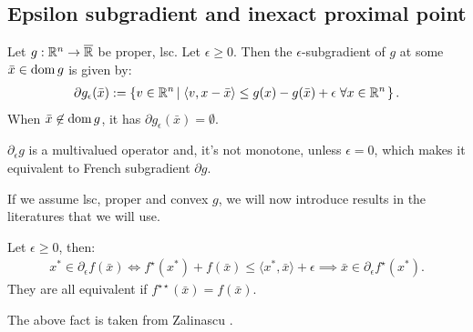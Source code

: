 \documentclass[12pt]{article}
\begin{document}
    \subsection{Epsilon subgradient and inexact proximal point}
        \begin{definition}\label{def:esp-subgrad}
            Let $g: \mathbb R^n \rightarrow \overline {\mathbb R}$ be proper, lsc. 
            Let $\epsilon \ge 0$. 
            Then the $\epsilon$-subgradient of $g$ at some $\bar x \in \operatorname{dom} g$ is given by: 
            $$
            \begin{aligned}
                \partial g_\epsilon(\bar  x) := 
                \left\lbrace
                    v \in \mathbb R^n \left| \; 
                        \langle v, x - \bar  x\rangle \le 
                        g(x) - g(\bar x) + \epsilon \;\forall x \in \mathbb R^n
                    \right. 
                \right\rbrace.
            \end{aligned}
            $$
            When $\bar x \not \in \operatorname{dom} g$, it has $\partial g_\epsilon(\bar x) = \emptyset$. 
        \end{definition}
        \begin{remark}
            $\partial_\epsilon g$ is a multivalued operator and, it's not monotone, unless $\epsilon = 0$, which makes it equivalent to French subgradient $\partial g$. 
        \end{remark}
        If we assume lsc, proper and convex $g$, we will now introduce results in the literatures that we will use. 
        \begin{fact}\label{fact:esp-fenchel-ineq}
            Let $\epsilon \ge 0$, then:
            \begin{align*}
                x^* \in \partial_\epsilon f(\bar x)\iff f^\star(x^*) + f(\bar x) \le \langle x^*, \bar x\rangle + \epsilon \implies \bar x \in \partial_\epsilon f^\star(x^*).
            \end{align*}
            They are all equivalent if $f^{\star\star}(\bar x) = f(\bar x)$. 
        \end{fact}
        \begin{remark}
            The above fact is taken from Zalinascu \cite[Theorem 2.4.2]{zalinescu_convex_2002}. 
        \end{remark}
\end{document}
